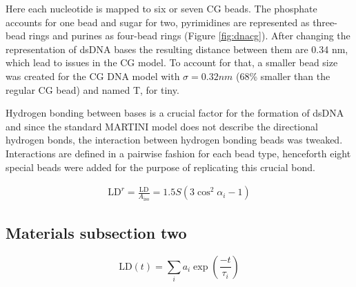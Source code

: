 \documentclass[a4,center,fleqn]{NAR}
\begin{document}
Here each nucleotide is mapped to six or seven CG beads. The phosphate accounts for one bead and sugar for two, pyrimidines are represented as three-bead rings and purines as four-bead rings (Figure \ref{fig:dnacg}). After changing the representation of dsDNA bases the resulting distance between them are 0.34 nm, which lead to issues in the CG model. To account for that, a smaller bead size was created for the CG DNA model with $\sigma = 0.32nm$ (68\% smaller than the regular CG bead) and named T, for tiny. 


Hydrogen bonding between bases is a crucial factor for the formation of dsDNA and since the standard MARTINI model does not describe the directional hydrogen bonds, the interaction between hydrogen bonding beads was tweaked. Interactions are defined in a pairwise fashion for each bead type, henceforth eight special beads were added for the purpose of replicating this crucial bond.


\begin{align}
\mathrm{LD}^r = \frac{\mathrm{LD}}{A_\mathrm{iso}}
= 1.5 S \left( 3 \cos^2 \alpha_i - 1 \right)
\end{align}


\subsection{Materials subsection two}
\lipsum

\begin{equation*}
\mathrm{LD} \left( t \right) =
\sum\limits_i
a_i \exp \left( \frac{-t}{\tau_i} \right)
\end{equation*}
\end{document}
